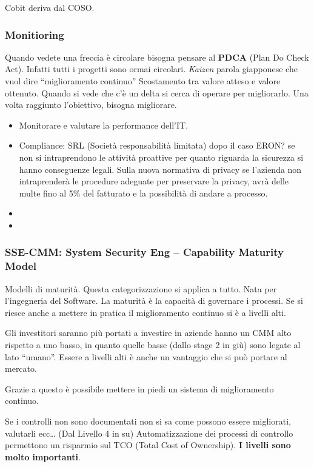 Cobit deriva dal COSO.

\subsubsection{Monitioring} 
Quando vedete una freccia è circolare bisogna pensare al \textbf{PDCA} (Plan Do 
Check Act). Infatti tutti i progetti sono ormai circolari.  
\emph{Kaizen} parola giapponese che vuol dire ``miglioramento continuo''
Scostamento tra valore atteso e valore ottenuto. Quando si vede che c'è un delta 
 si cerca di operare per migliorarlo.
Una volta raggiunto l'obiettivo, bisogna migliorare.

\begin{itemize}
\item Monitorare e valutare la performance dell'IT.
\item Compliance:
SRL (Società responsabilità limitata) dopo il caso ERON? se non si intraprendono 
le attività proattive per quanto riguarda la sicurezza si hanno conseguenze 
legali.
Sulla nuova normativa di privacy se l'azienda non intraprenderà le procedure 
adeguate per preservare la privacy, avrà delle multe fino al 5\% del fatturato e 
la possibilità di andare a processo.
\item 
\item 
\end{itemize}

\subsubsection{SSE-CMM: System Security Eng -- Capability Maturity Model}
Modelli di maturità. Questa categorizzazione si applica a tutto. Nata per 
l'ingegneria del Software.
La maturità è la capacità di governare i processi. Se si riesce anche a mettere 
in pratica il miglioramento continuo si è a livelli alti.

Gli investitori saranno più portati a investire in aziende hanno un CMM alto 
rispetto a uno basso, in quanto quelle basse (dallo stage 2 in giù) sono legate 
al lato ``umano''. Essere a livelli alti è anche un vantaggio che si può portare 
al mercato.

Grazie a questo è possibile mettere in piedi un sistema di miglioramento 
continuo.

Se i controlli non sono documentati non si sa come possono essere migliorati, 
valutarli ecc\dots
(Dal Livello 4 in su) Automatizzazione dei processi di controllo permettono un 
risparmio sul TCO (Total Cost of Ownership).
\textbf{I livelli sono molto importanti}.


